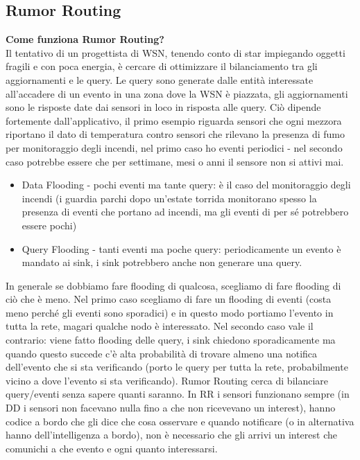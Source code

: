 \documentclass[12pt,italian]{report}
\begin{document}
\subsection{Rumor Routing}
\noindent \textbf{Come funziona Rumor Routing?} \\
Il tentativo di un progettista di WSN, tenendo conto di star impiegando oggetti fragili e con poca energia, è cercare di ottimizzare il bilanciamento tra gli aggiornamenti e le query. Le query sono generate dalle entità interessate all'accadere di un evento in una zona dove la WSN è piazzata, gli aggiornamenti sono le risposte date dai sensori in loco in risposta alle query. Ciò dipende fortemente dall'applicativo, il primo esempio riguarda sensori che ogni mezzora riportano il dato di temperatura contro sensori che rilevano la presenza di fumo per monitoraggio degli incendi, nel primo caso ho eventi periodici - nel secondo caso potrebbe essere che per settimane, mesi o anni il sensore non si attivi mai. 
\begin{itemize}
    \item Data Flooding - pochi eventi ma tante query: è il caso del monitoraggio degli incendi (i guardia parchi dopo un'estate torrida monitorano spesso la presenza di eventi che portano ad incendi, ma gli eventi di per sé potrebbero essere pochi)
    \item Query Flooding - tanti eventi ma poche query: periodicamente un evento è mandato ai sink, i sink potrebbero anche non generare una query. 
\end{itemize}
In generale se dobbiamo fare flooding di qualcosa, scegliamo di fare flooding di ciò che è meno. Nel primo caso scegliamo di fare un flooding di eventi (costa meno perché gli eventi sono sporadici) e in questo modo portiamo l'evento in tutta la rete, magari qualche nodo è interessato. Nel secondo caso vale il contrario: viene fatto flooding delle query, i sink chiedono sporadicamente ma quando questo succede c'è alta probabilità di trovare almeno una notifica dell'evento che si sta verificando (porto le query per tutta la rete, probabilmente vicino a dove l'evento si sta verificando). 
\bigbreak
Rumor Routing cerca di bilanciare query/eventi senza sapere quanti saranno. In RR i sensori funzionano sempre (in DD i sensori non facevano nulla fino a che non ricevevano un interest), hanno codice a bordo che gli dice che cosa osservare e quando notificare (o in alternativa hanno dell'intelligenza a bordo), non è necessario che gli arrivi un interest che comunichi a che evento e ogni quanto interessarsi. 
\bigbreak
\end{document}

